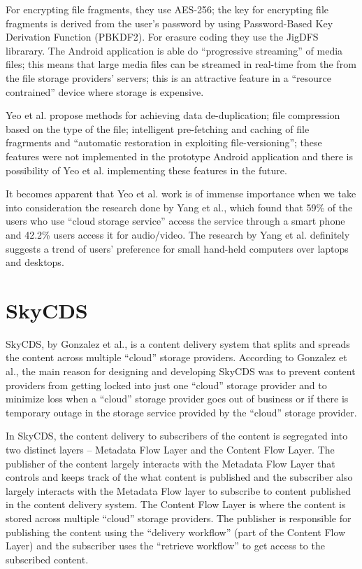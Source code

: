 For encrypting file fragments, they use AES-256; the key for
encrypting file fragments is derived from the user's password by using
Password-Based Key Derivation Function (PBKDF2)\cite{kaliski}. For
erasure coding they use the JigDFS librarary\cite{jigdfs}. The Android
application is able do ``progressive streaming'' of media files; this
means that large media files can be streamed in real-time from the
from the file storage providers' servers; this is an attractive
feature in a ``resource contrained'' device where storage is
expensive.

Yeo et al. propose methods for achieving data de-duplication; file
compression based on the type of the file; intelligent pre-fetching
and caching of file fragrments and ``automatic restoration in
exploiting file-versioning''; these features were not implemented in
the prototype Android application and there is possibility of Yeo et
al. implementing these features in the future.

It becomes apparent that Yeo et al. work is of immense importance when
we take into consideration the research done by Yang et al., which
found that 59\% of the users who use ``cloud storage service'' access
the service through a smart phone and 42.2\% users access it for
audio/video\cite{yang}. The research by Yang et al. definitely
suggests a trend of users' preference for small hand-held computers
over laptops and desktops.

\section{SkyCDS}\label{2-skycds-sec}

SkyCDS, by Gonzalez et al., is a content delivery system that splits
and spreads the content across multiple ``cloud'' storage
providers\cite{skycds}. According to Gonzalez et al., the main reason
for designing and developing SkyCDS was to prevent content providers
from getting locked into just one ``cloud'' storage provider and to
minimize loss when a ``cloud'' storage provider goes out of business
or if there is temporary outage in the storage service provided by the
``cloud'' storage provider.

In SkyCDS, the content delivery to subscribers of the content is
segregated into two distinct layers -- Metadata Flow Layer and the
Content Flow Layer. The publisher of the content largely interacts
with the Metadata Flow Layer that controls and keeps track of the what
content is published and the subscriber also largely interacts with
the Metadata Flow layer to subscribe to content published in the
content delivery system. The Content Flow Layer is where the content
is stored across multiple ``cloud'' storage providers. The publisher
is responsible for publishing the content using the ``delivery
workflow'' (part of the Content Flow Layer) and the subscriber uses
the ``retrieve workflow'' to get access to the subscribed content.

